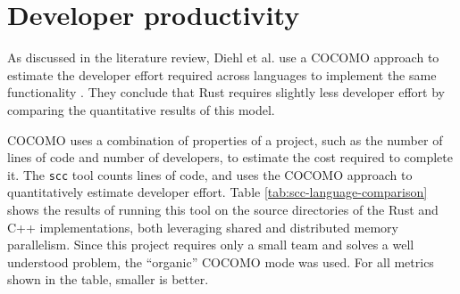 \section{Developer productivity}
\label{sec:developer-productivity}

As discussed in the literature review, Diehl et al. use a \acrshort{COCOMO} approach to estimate the developer effort required across languages to implement the same functionality \cite{diehlBenchmarkingParallel1D2023}. They conclude that Rust requires slightly less developer effort by comparing the quantitative results of this model.

\acrshort{COCOMO} uses a combination of properties of a project, such as the number of lines of code and number of developers, to estimate the cost required to complete it. The \texttt{scc} tool counts lines of code, and uses the \acrshort{COCOMO} approach to quantitatively estimate developer effort. Table \ref{tab:scc-language-comparison} shows the results of running this tool on the source directories of the Rust and C++ implementations, both leveraging shared and distributed memory parallelism. Since this project requires only a small team and solves a well understood problem, the ``organic'' \acrshort{COCOMO} mode was used. For all metrics shown in the table, smaller is better.

